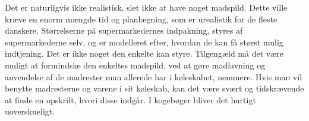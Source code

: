 Det er naturligvis ikke realistisk, slet ikke at have noget madspild. Dette ville kræve en enorm mængde tid og planlægning, som er urealistik for de fleste danskere. Størrelserne på supermarkedernes indpakning, styres af supermarkederne selv, og er modelleret efter, hvordan de kan få størst mulig indtjening. Det er ikke noget den enkelte kan styre. Tilgengæld må det være muligt at formindske den enkeltes madspild, ved at gøre madlavning og anvendelse af de madrester man allerede har i køleskabet, nemmere. Hvis man vil benytte madresterne og varene i sit køleskab, kan det være svært og tidskrævende at finde en opskrift, hvori disse indgår. I kogebøger bliver det hurtigt uoverskueligt.  


